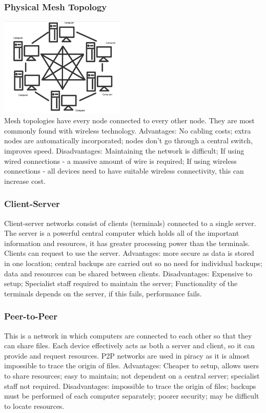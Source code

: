 \documentclass[a4paper,11pt, twocolumn]{article}
\begin{document}
\subsubsection{Physical Mesh Topology}
\includegraphics[width=0.45\textwidth]{topoMesh.jpg}\\
Mesh topologies have every node connected to every other node. They are most commonly found with wireless technology. Advantages: No cabling costs; extra nodes are automatically incorporated; nodes don't go through a central switch, improves speed. Disadvantages: Maintaining the network is difficult; If using wired connections - a massive amount of wire is required; If using wireless connections - all devices need to have suitable wireless connectivity, this can increase cost.
\subsubsection{Client-Server}
Client-server networks consist of clients (terminals) connected to a single server. The server is a powerful central computer which holds all of the important information and resources, it has greater processing power than the terminals. Clients can request to use the server. Advantages: more secure as data is stored in one location; central backups are carried out so no need for individual backups; data and resources can be shared between clients. Disadvantages: Expensive to setup; Specialist staff required to maintain the server; Functionality of the terminals depends on the server, if this fails, performance fails.
\subsubsection{Peer-to-Peer}
This is a network in which computers are connected to each other so that they can share files. Each device effectively acts as both a server and client, so it can provide and request resources. P2P networks are used in piracy as it is almost impossible to trace the origin of files. Advantages: Cheaper to setup, allows users to share resources; easy to maintain; not dependent on a central server; specialist staff not required. Disadvantages: impossible to trace the origin of files; backups must be performed of each computer separately; poorer security; may be difficult to locate resources.
\end{document}
